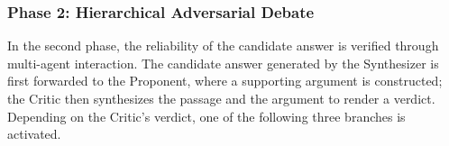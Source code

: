 


\subsubsection{Phase 2: Hierarchical Adversarial Debate}

In the second phase, the reliability of the candidate answer is verified through multi-agent interaction.
The candidate answer generated by the Synthesizer is first forwarded to the Proponent, where a supporting argument is constructed; the Critic then synthesizes the passage and the argument to render a verdict.
Depending on the Critic's verdict, one of the following three branches is activated.



